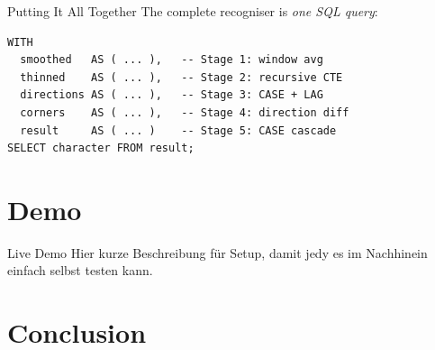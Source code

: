 \documentclass[aspectratio=169, 12pt]{beamer}
\begin{document}
\begin{frame}[fragile]{Putting It All Together}
  The complete recogniser is \emph{one SQL query}:

  \begin{lstlisting}[basicstyle=\ttfamily\footnotesize]
WITH
  smoothed   AS ( ... ),   -- Stage 1: window avg
  thinned    AS ( ... ),   -- Stage 2: recursive CTE
  directions AS ( ... ),   -- Stage 3: CASE + LAG
  corners    AS ( ... ),   -- Stage 4: direction diff
  result     AS ( ... )    -- Stage 5: CASE cascade
SELECT character FROM result;
  \end{lstlisting}

\end{frame}

\section{Demo}

\begin{frame}{Live Demo}
  \alert{Hier kurze Beschreibung für Setup, damit jedy es im Nachhinein einfach selbst testen kann.}
\end{frame}

\section{Conclusion}
\end{document}
